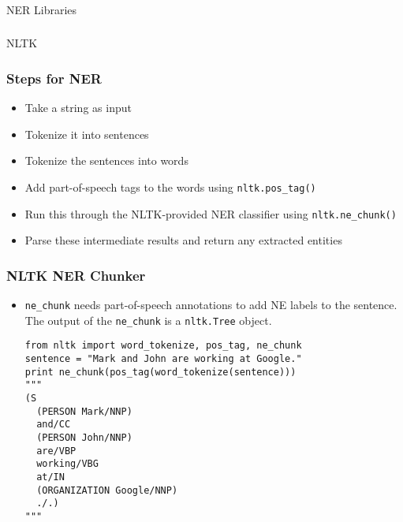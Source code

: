 \begin{frame}[fragile]\frametitle{}

\begin{center}
{\Large NER Libraries}
\end{center}
\end{frame}

\begin{frame}[fragile]\frametitle{}

\begin{center}
{\Large NLTK}
\end{center}
\end{frame}

\begin{frame}[fragile]\frametitle{Steps for NER}
  \begin{itemize}
  \item Take a string as input
  \item Tokenize it into sentences
  \item Tokenize the sentences into words
  \item Add part-of-speech tags to the words using \lstinline|nltk.pos_tag()|
  \item  Run this through the NLTK-provided NER classifier using \lstinline|nltk.ne_chunk()|
  \item  Parse these intermediate results and return any extracted entities

  \end{itemize}
\end{frame}


\begin{frame}[fragile]\frametitle{NLTK NER Chunker}
  \begin{itemize}
  \item \lstinline|ne_chunk| needs part-of-speech annotations to add NE labels to the sentence. The output of the \lstinline|ne_chunk| is a \lstinline|nltk.Tree| object.
  \begin{lstlisting}
from nltk import word_tokenize, pos_tag, ne_chunk
sentence = "Mark and John are working at Google."
print ne_chunk(pos_tag(word_tokenize(sentence)))
"""
(S
  (PERSON Mark/NNP)
  and/CC
  (PERSON John/NNP)
  are/VBP
  working/VBG
  at/IN
  (ORGANIZATION Google/NNP)
  ./.)
"""
  \end{lstlisting}
  \end{itemize}
\end{frame}


